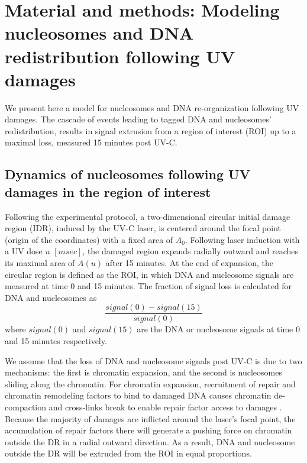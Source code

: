 \documentclass[12pt]{article}
\begin{document}
 \section{Material and methods: Modeling nucleosomes and DNA redistribution following UV damages} 
	
	We present here a model for nucleosomes and DNA re-organization following
	UV damages. The cascade of events leading to tagged DNA and nucleosomes'
	redistribution, results in signal extrusion from a region of interest (ROI) up
	to a maximal loss, measured 15 minutes post UV-C.
	
	\subsection{Dynamics of nucleosomes following UV damages in the region of interest}
	
	Following the experimental protocol, a two-dimensional circular initial damage region (IDR), induced by the UV-C laser, is centered around the focal point (origin of the coordinates) with a fixed area of $A_0$. Following
	laser induction with a UV dose $u$ $[msec]$, the damaged region expands radially outward and reaches its maximal area of $A(u)$ after 15 minutes. At the end of expansion, the circular region is defined	as the ROI, in which DNA and nucleosome signals are measured at
	time 0 and 15 minutes. The fraction of signal loss is calculated for DNA and nucleosomes as
	\begin{equation*}
	\frac{signal(0)-signal(15)}{signal(0)}
	\end{equation*}	
	where $signal(0)$ and $signal(15)$ are the DNA or nucleosome signals at time 0 and 15 minutes respectively. 
	
	We assume that the loss of DNA and nucleosome signals post UV-C is due
	to two mechanisms: the first is chromatin expansion, and the second is nucleosomes sliding along the chromatin. For chromatin expansion, recruitment of repair and chromatin remodeling factors to bind to damaged DNA causes chromatin de-compaction and cross-links break \cite{luijsterburg2012ddb2} to enable repair factor access to damages \cite{gaillard2003chromatin}. Because the majority of damages are inflicted around the laser's focal point, the accumulation of repair factors there \cite{dinant2007activation} will generate a pushing force on chromatin outside the DR in a radial outward direction. As a result, DNA and nucleosome outside the DR will be extruded from the ROI in equal proportions. 
	
\end{document}

